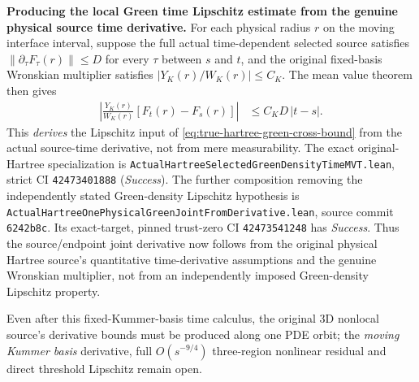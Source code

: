\documentclass[11pt]{amsart}
\begin{document}
\medskip
\noindent\textbf{Producing the local Green time Lipschitz estimate
from the genuine physical source time derivative.}
For each physical radius \(r\) on the moving interface interval,
suppose the full actual time-dependent selected source satisfies
\(\|\partial_\tau F_\tau(r)\|\le D\) for every \(\tau\) between
\(s\) and \(t\), and the original fixed-basis Wronskian multiplier
satisfies \(|Y_K(r)/W_K(r)|\le C_K\). The mean value theorem then
gives
\begin{align}
 \left|\frac{Y_K(r)}{W_K(r)}
          [F_t(r)-F_s(r)]\right|
 &\le C_KD\,|t-s|.
 \label{eq:true-hartree-green-density-time-mvt}
\end{align}
This \emph{derives} the Lipschitz input of
\eqref{eq:true-hartree-green-cross-bound}
from the actual source-time derivative, not from mere
measurability. The exact original-Hartree specialization is
\texttt{ActualHartreeSelectedGreenDensityTimeMVT.lean},
strict CI \texttt{42473401888} (\emph{Success}).
The further composition removing the independently stated
Green-density Lipschitz hypothesis is
\texttt{ActualHartreeOnePhysicalGreenJointFromDerivative.lean},
source commit \texttt{6242b8c}. Its exact-target, pinned
trust-zero CI \texttt{42473541248} has \emph{Success}.
Thus the source/endpoint joint derivative now follows from the
original physical Hartree source's quantitative time-derivative
assumptions and the genuine Wronskian multiplier, not from an
independently imposed Green-density Lipschitz property.

Even after this fixed-Kummer-basis time calculus, the original
3D nonlocal source's derivative bounds must be produced along
one PDE orbit; the \emph{moving Kummer basis} derivative,
full \(O(s^{-9/4})\) three-region nonlinear residual and direct
threshold Lipschitz remain open.
\end{document}
